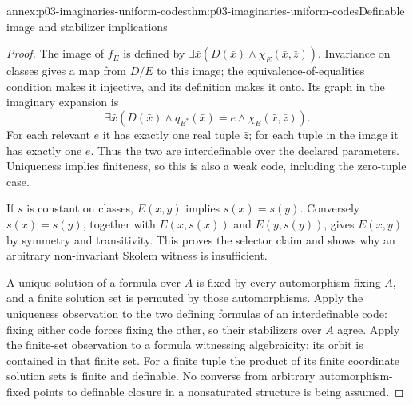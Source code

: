 \begin{annexitem}{annex:p03-imaginaries-uniform-codes}{thm:p03-imaginaries-uniform-codes}{Definable image and stabilizer implications}
\begin{proof}
The image of \(f_E\) is defined by
\(\exists\bar x(D(\bar x)\land\chi_E(\bar x,\bar z))\).
Invariance on classes gives a map from \(D/E\) to this image; the
equivalence-of-equalities condition makes it injective, and its definition
makes it onto. Its graph in the imaginary expansion is
\[
 \exists\bar x(D(\bar x)\land q_{E^*}(\bar x)=e
                              \land\chi_E(\bar x,\bar z)).
\]
For each relevant \(e\) it has exactly one real tuple \(\bar z\);
for each tuple in the image it has exactly one \(e\). Thus the two
are interdefinable over the declared parameters. Uniqueness implies finiteness,
so this is also a weak code, including the zero-tuple case.

If \(s\) is constant on classes, \(E(x,y)\) implies \(s(x)=s(y)\).
Conversely \(s(x)=s(y)\), together with \(E(x,s(x))\) and
\(E(y,s(y))\), gives \(E(x,y)\) by symmetry and transitivity.
This proves the selector claim and shows why an arbitrary non-invariant
Skolem witness is insufficient.

A unique solution of a formula over \(A\) is fixed by every automorphism
fixing \(A\), and a finite solution set is permuted by those automorphisms.
Apply the uniqueness observation to the two defining formulas of an
interdefinable code: fixing either code forces fixing the other, so their
stabilizers over \(A\) agree. Apply the finite-set observation to a
formula witnessing algebraicity: its orbit is contained in that finite set.
For a finite tuple the product of its finite coordinate solution sets is
finite and definable. No converse from arbitrary automorphism-fixed points
to definable closure in a nonsaturated structure is being assumed.
\end{proof}
\end{annexitem}

